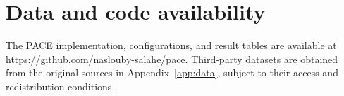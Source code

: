 \documentclass[11pt]{article}
\newcommand{\appendixtext}[1]{\ifdefined\withsupplement #1\fi}
\begin{document}
\section*{Data and code availability}
The PACE implementation, configurations, and result tables are available at \url{https://github.com/naslouby-salahe/pace}. Third-party datasets are obtained from the original sources\appendixtext{ in Appendix~\ref{app:data}}, subject to their access and redistribution conditions.
\setlength{\bibsep}{0pt}
\small


\end{document}
